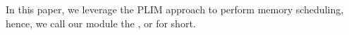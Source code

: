 In this paper, we leverage the PLIM approach to perform memory
scheduling, hence, we call our module the \schimL, or \schim for short.





